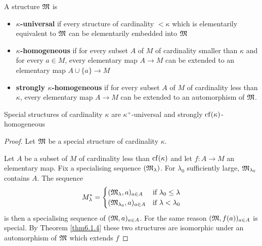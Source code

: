 \documentclass[11pt]{article}
\begin{document}
\begin{definition}[]
A structure \(\mathfrak{M}\) is
\begin{itemize}
\item \textbf{\(\kappa\)-universal} if every structure of cardinality \(<\kappa\) which is elementarily
equivalent to \(\mathfrak{M}\) can be elementarily embedded into \(\mathfrak{M}\)
\item \textbf{\(\kappa\)-homogeneous} if for every subset \(A\) of \(M\) of cardinality smaller than \(\kappa\)
and for every \(a\in M\), every elementary map \(A\to M\) can be extended to an elementary
map \(A\cup\{a\}\to M\)
\item \textbf{strongly \(\kappa\)-homogeneous} if for every subset \(A\) of \(M\) of cardinality less than \(\kappa\), every
elementary map \(A\to M\) can be extended to an automorphism of \(\mathfrak{M}\).
\end{itemize}
\end{definition}

\begin{theorem}[]
Special structures of cardinality \(\kappa\) are \(\kappa^+\)-universal and strongly \(\operatorname{cf}(\kappa)\)-homogeneous
\end{theorem}

\begin{proof}
Let \(\mathfrak{M}\) be a special structure of cardinality \(\kappa\).


Let \(A\) be a subset of \(M\) of cardinality less than \(\operatorname{cf}(\kappa)\) and let \(f:A\to M\) an
elementary map. Fix a specialising sequence \((\mathfrak{M}_\lambda)\). For \(\lambda_0\) sufficiently
large, \(\mathfrak{M}_{\lambda_0}\) contains \(A\). The sequence
\begin{equation*}
M_\lambda^*=
\begin{cases}
(\mathfrak{M}_\lambda,a)_{a\in A}&\text{if }\lambda_0\le\lambda\\
(\mathfrak{M}_{\lambda_0},a)_{a\in A}&\text{if }\lambda<\lambda_0
\end{cases}
\end{equation*}
is then a specialising sequence of \((\mathfrak{M},a)_{a\in A}\). For the same reason \((\mathfrak{M},f(a))_{a\in A}\) is
special. By Theorem \ref{thm6.1.4} these two structures are isomorphic under an automorphism
of \(\mathfrak{M}\) which extends \(f\)
\end{proof}
\end{document}
